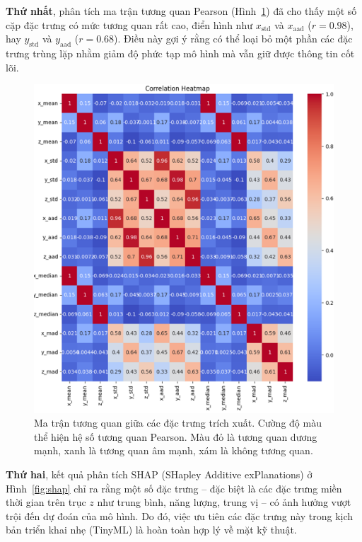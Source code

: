 \textbf{Thứ nhất}, phân tích ma trận tương quan Pearson (Hình~\ref{fig:correlation}) đã cho thấy một số cặp đặc trưng có mức tương quan rất cao, điển hình như $x_{\mathrm{std}}$ và $x_{\mathrm{aad}}$ ($r = 0.98$), hay $y_{\mathrm{std}}$ và $y_{\mathrm{aad}}$ ($r = 0.68$). Điều này gợi ý rằng có thể loại bỏ một phần các đặc trưng trùng lặp nhằm giảm độ phức tạp mô hình mà vẫn giữ được thông tin cốt lõi.

\begin{figure}[htbp]
\centering
\includegraphics[width=1\linewidth]{images/correlation.png} 
\caption{Ma trận tương quan giữa các đặc trưng trích xuất. Cường độ màu thể hiện hệ số tương quan Pearson. Màu đỏ là tương quan dương mạnh, xanh là tương quan âm mạnh, xám là không tương quan.}
\label{fig:correlation}
\end{figure}

\textbf{Thứ hai}, kết quả phân tích SHAP (SHapley Additive exPlanations) ở Hình~\ref{fig:shap} chỉ ra rằng một số đặc trưng – đặc biệt là các đặc trưng miền thời gian trên trục $z$ như trung bình, năng lượng, trung vị – có ảnh hưởng vượt trội đến dự đoán của mô hình. Do đó, việc ưu tiên các đặc trưng này trong kịch bản triển khai nhẹ (TinyML) là hoàn toàn hợp lý về mặt kỹ thuật.


